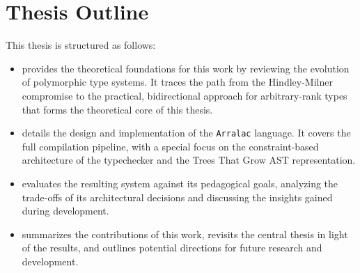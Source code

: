 \section{Thesis Outline}

This thesis is structured as follows:

\begin{itemize}
    \item \textbf{} provides the theoretical foundations for this work by reviewing the evolution of polymorphic type systems. It traces the path from the Hindley-Milner compromise to the practical, bidirectional approach for arbitrary-rank types that forms the theoretical core of this thesis.
    \item \textbf{} details the design and implementation of the \texttt{Arralac} language. It covers the full compilation pipeline, with a special focus on the constraint-based architecture of the typechecker and the Trees That Grow AST representation.
    \item \textbf{} evaluates the resulting system against its pedagogical goals, analyzing the trade-offs of its architectural decisions and discussing the insights gained during development.
    \item \textbf{} summarizes the contributions of this work, revisits the central thesis in light of the results, and outlines potential directions for future research and development.
\end{itemize}